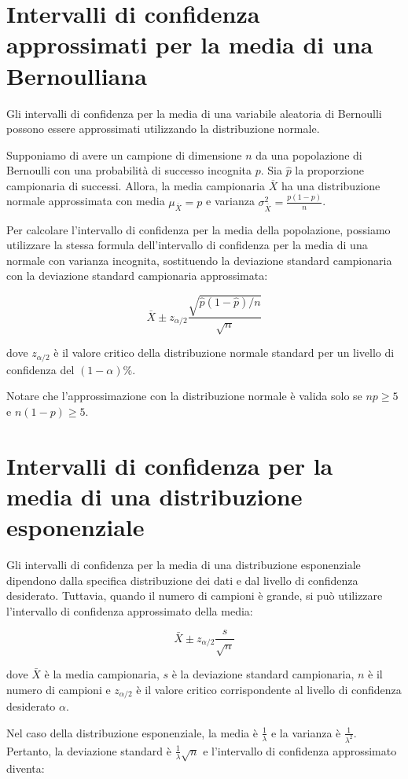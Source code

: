 \section{Intervalli di confidenza approssimati per la media di una Bernoulliana}

Gli intervalli di confidenza per la media di una variabile aleatoria di Bernoulli possono essere approssimati utilizzando la distribuzione normale. 

Supponiamo di avere un campione di dimensione $n$ da una popolazione di Bernoulli con una probabilità di successo incognita $p$. Sia $\hat{p}$ la proporzione campionaria di successi. Allora, la media campionaria $\overline{X}$ ha una distribuzione normale approssimata con media $\mu_{\overline{X}} = p$ e varianza $\sigma^2_{\overline{X}} = \frac{p(1-p)}{n}$. 

Per calcolare l'intervallo di confidenza per la media della popolazione, possiamo utilizzare la stessa formula dell'intervallo di confidenza per la media di una normale con varianza incognita, sostituendo la deviazione standard campionaria con la deviazione standard campionaria approssimata:

$$
\overline{X} \pm z_{\alpha/2} \frac{\sqrt{\hat{p}(1-\hat{p})/n}}{\sqrt{n}}
$$

dove $z_{\alpha/2}$ è il valore critico della distribuzione normale standard per un livello di confidenza del $(1-\alpha)\%$. 

Notare che l'approssimazione con la distribuzione normale è valida solo se $np \geq 5$ e $n(1-p) \geq 5$.

\section{Intervalli di confidenza per la media di una distribuzione esponenziale}
Gli intervalli di confidenza per la media di una distribuzione esponenziale dipendono dalla specifica distribuzione dei dati e dal livello di confidenza desiderato. Tuttavia, quando il numero di campioni è grande, si può utilizzare l'intervallo di confidenza approssimato della media:

$$\bar{X} \pm z_{\alpha/2} \frac{s}{\sqrt{n}}$$

dove $\bar{X}$ è la media campionaria, $s$ è la deviazione standard campionaria, $n$ è il numero di campioni e $z_{\alpha/2}$ è il valore critico corrispondente al livello di confidenza desiderato $\alpha$.

Nel caso della distribuzione esponenziale, la media è $\frac{1}{\lambda}$ e la varianza è $\frac{1}{\lambda^2}$. Pertanto, la deviazione standard è $\frac{1}{\lambda}\sqrt{n}$ e l'intervallo di confidenza approssimato diventa:

